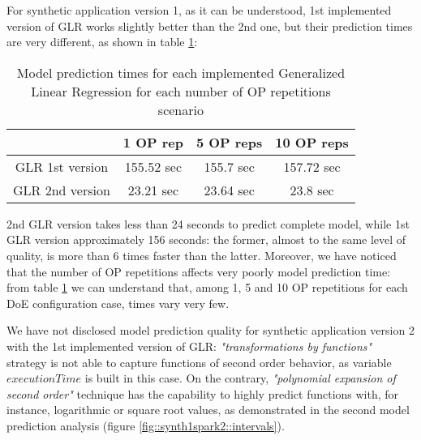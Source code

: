 For synthetic application version 1, as it can be understood, 1st implemented version of GLR works slightly better than the 2nd one, but their prediction times are very different, as shown in table \ref{tab::GLRtimes}:

\begin{table}[H]

    \centering
    
    \begin{tabular}{cccc}
    
        \toprule
         & 1 OP rep & 5 OP reps & 10 OP reps \\
        \midrule
        GLR 1st version & 155.52 sec & 155.7 sec & 157.72 sec \\
        GLR 2nd version & 23.21 sec & 23.64 sec & 23.8 sec \\
        \bottomrule 
    
    \end{tabular}

    \caption{Model prediction times for each implemented Generalized Linear Regression for each number of OP repetitions scenario}
    \label{tab::GLRtimes}
    
\end{table}

2nd GLR version takes less than 24 seconds to predict complete model, while 1st GLR version approximately 156 seconds: the former, almost to the same level of quality, is more than 6 times faster than the latter. Moreover, we have noticed that the number of OP repetitions affects very poorly model prediction time: from table \ref{tab::GLRtimes} we can understand that, among 1, 5 and 10 OP repetitions for each DoE configuration case, times vary very few.

We have not disclosed model prediction quality for synthetic application version 2 with the 1st implemented version of GLR: \textit{"transformations by functions"} strategy is not able to capture functions of second order behavior, as variable $executionTime$ is built in this case. On the contrary, \textit{"polynomial expansion of second order"} technique has the capability to highly predict functions with, for instance, logarithmic or square root values, as demonstrated in the second model prediction analysis (figure \ref{fig::synth1spark2::intervals}).

